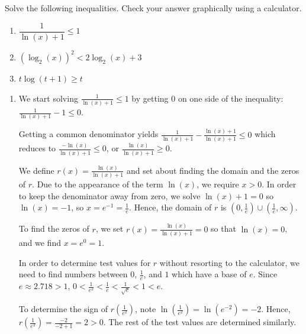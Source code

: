 \documentclass{ximera}
\begin{document}
\begin{example}  Solve the following inequalities.  Check your answer graphically using a calculator.
\label{logineq}

\begin{enumerate}

\item  $\dfrac{1}{\ln(x)+1} \leq 1$

\item  $\left(\log_{2}(x)\right)^2 < 2 \log_{2}(x) + 3$

\item  $t \log(t+1) \geq t$

\end{enumerate}


\begin{explanation}

\begin{enumerate}

\item  We start solving $\frac{1}{\ln(x)+1} \leq 1$ by getting $0$ on one side of the inequality: $\frac{1}{\ln(x)+1}  - 1 \leq 0$.  

Getting a common denominator yields $\frac{1}{\ln(x)+1}  - \frac{\ln(x)+1}{\ln(x)+1} \leq 0$ which reduces to $\frac{-\ln(x)}{\ln(x)+1} \leq 0$, or $ \frac{\ln(x)}{\ln(x)+1} \geq 0$.  

We define $r(x) = \frac{\ln(x)}{\ln(x)+1}$ and set about finding the domain and the zeros of $r$.  Due to the appearance of the term $\ln(x)$, we require  $x > 0$.  In order to keep the denominator away from zero, we solve $\ln(x)+1 = 0$ so $\ln(x) = -1$, so $x = e^{-1} = \frac{1}{e}$.  Hence, the domain of $r$ is $\left(0, \frac{1}{e}\right) \cup \left(\frac{1}{e}, \infty\right)$. 

To find the zeros of $r$, we set $r(x) = \frac{\ln(x)}{\ln(x)+1} = 0$ so that $\ln(x) = 0$, and we find $x = e^{0} = 1$.  


In order to determine test values for $r$ without resorting to the calculator, we need to find numbers between $0$, $\frac{1}{e}$, and $1$ which have a base of $e$.  Since $e \approx 2.718 > 1$, $0 < \frac{1}{e^2} < \frac{1}{e} < \frac{1}{\sqrt{e}} < 1 < e$.  



To determine the sign of $r\left( \frac{1}{e^2} \right)$, note $\ln\left(\frac{1}{e^2}\right) = \ln\left(e^{-2}\right) = -2$. Hence, $r\left( \frac{1}{e^2} \right) = \frac{-2}{-2+1} = 2 > 0$.  The rest of the test values are determined similarly.   



\end{enumerate}
\end{explanation}
\end{example}
\end{document}
